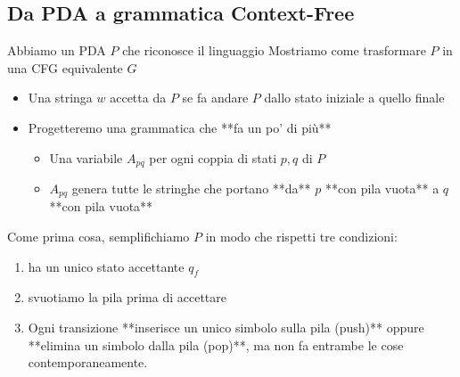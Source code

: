 \subsection{Da PDA a grammatica Context-Free}
Abbiamo un PDA $P$ che riconosce il linguaggio 
Mostriamo come trasformare $P$ in una CFG equivalente $G$ 
\begin{itemize}
	\item Una stringa $w$ accetta da $P$ se fa andare $P$ dallo stato iniziale a quello finale
	\item Progetteremo una grammatica che **fa un po' di più** 
		\begin{itemize}
			\item Una variabile $A_{pq}$ per ogni coppia di stati $p,q$ di $P$ 
			\item $A_{pq}$ genera tutte le stringhe che portano **da** $p$ **con pila vuota** a $q$ **con pila vuota**
		\end{itemize}
\end{itemize}
Come prima cosa, semplifichiamo $P$ in modo che rispetti tre condizioni:
\begin{enumerate}
	\item ha un unico stato accettante $q_f$ 
	\item svuotiamo la pila prima di accettare
	\item  Ogni transizione **inserisce un unico simbolo sulla pila (push)** oppure **elimina un simbolo dalla pila (pop)**, ma non fa entrambe le cose contemporaneamente. 
\end{enumerate}

